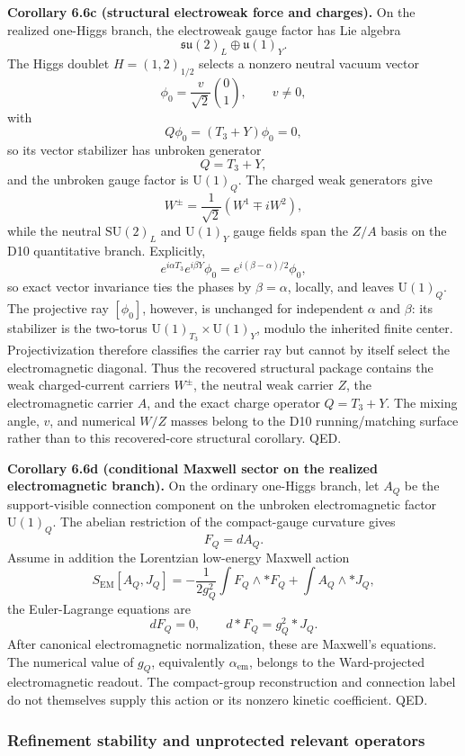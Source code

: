 \textbf{Corollary 6.6c (structural electroweak force and charges).} On the realized one-Higgs branch, the electroweak gauge factor has Lie algebra
\[
\mathfrak{su}(2)_L\oplus\mathfrak{u}(1)_Y.
\]
The Higgs doublet \(H=(1,2)_{1/2}\) selects a nonzero neutral vacuum vector
\[
\phi_0=\frac{v}{\sqrt2}\binom{0}{1},\qquad v\ne0,
\]
with
\[
Q\phi_0=(T_3+Y)\phi_0=0,
\]
so its vector stabilizer has unbroken generator
\[
Q=T_3+Y,
\]
and the unbroken gauge factor is \(\mathrm U(1)_Q\). The charged weak generators give
\[
W^\pm=\frac{1}{\sqrt2}(W^1\mp iW^2),
\]
while the neutral \(\mathrm{SU}(2)_L\) and \(\mathrm U(1)_Y\) gauge fields span the \(Z/A\) basis on the D10 quantitative branch. Explicitly,
\[
e^{i\alpha T_3}e^{i\beta Y}\phi_0
=e^{i(\beta-\alpha)/2}\phi_0,
\]
so exact vector invariance ties the phases by \(\beta=\alpha\), locally, and leaves \(\mathrm U(1)_Q\). The projective ray \([\phi_0]\), however, is unchanged for independent \(\alpha\) and \(\beta\): its stabilizer is the two-torus \(\mathrm U(1)_{T_3}\times\mathrm U(1)_Y\), modulo the inherited finite center. Projectivization therefore classifies the carrier ray but cannot by itself select the electromagnetic diagonal. Thus the recovered structural package contains the weak charged-current carriers \(W^\pm\), the neutral weak carrier \(Z\), the electromagnetic carrier \(A\), and the exact charge operator \(Q=T_3+Y\). The mixing angle, \(v\), and numerical \(W/Z\) masses belong to the D10 running/matching surface rather than to this recovered-core structural corollary. QED.

\textbf{Corollary 6.6d (conditional Maxwell sector on the realized electromagnetic branch).} On the ordinary one-Higgs branch, let \(A_Q\) be the support-visible connection component on the unbroken electromagnetic factor \(\mathrm U(1)_Q\). The abelian restriction of the compact-gauge curvature gives
\[
F_Q=dA_Q.
\]
Assume in addition the Lorentzian low-energy Maxwell action
\[
S_{\mathrm{EM}}[A_Q,J_Q]
=
-\frac{1}{2g_Q^2}\int F_Q\wedge *F_Q
+\int A_Q\wedge *J_Q,
\]
the Euler-Lagrange equations are
\[
dF_Q=0,
\qquad
d*F_Q=g_Q^2 *J_Q.
\]
After canonical electromagnetic normalization, these are Maxwell's equations. The numerical value of \(g_Q\), equivalently \(\alpha_{\mathrm{em}}\), belongs to the Ward-projected electromagnetic readout. The compact-group reconstruction and connection label do not themselves supply this action or its nonzero kinetic coefficient. QED.

\subsubsection{Refinement stability and unprotected relevant operators}\label{63-refinement-stability-and-unprotected-relevant-operators}

